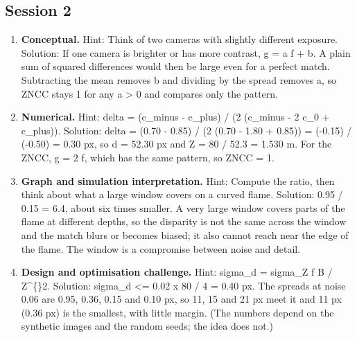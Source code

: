 \documentclass[11pt,a4paper]{article}
\begin{document}
\subsection*{Session 2}
\begin{enumerate}[nosep]
\item \textbf{Conceptual.} Hint: Think of two cameras with slightly different exposure. Solution: If one camera is brighter or has more contrast, g = a f + b. A plain sum of squared differences would then be large even for a perfect match. Subtracting the mean removes b and dividing by the spread removes a, so ZNCC stays 1 for any a > 0 and compares only the pattern.
\item \textbf{Numerical.} Hint: delta = (c\_minus - c\_plus) / (2 (c\_minus - 2 c\_0 + c\_plus)). Solution: delta = (0.70 - 0.85) / (2 (0.70 - 1.80 + 0.85)) = (-0.15) / (-0.50) = 0.30 px, so d = 52.30 px and Z = 80 / 52.3 = 1.530 m. For the ZNCC, g = 2 f, which has the same pattern, so ZNCC = 1.
\item \textbf{Graph and simulation interpretation.} Hint: Compute the ratio, then think about what a large window covers on a curved flame. Solution: 0.95 / 0.15 = 6.4, about six times smaller. A very large window covers parts of the flame at different depths, so the disparity is not the same across the window and the match blurs or becomes biased; it also cannot reach near the edge of the flame. The window is a compromise between noise and detail.
\item \textbf{Design and optimisation challenge.} Hint: sigma\_d = sigma\_Z f B / Z\textasciicircum\{\}2. Solution: sigma\_d <= 0.02 x 80 / 4 = 0.40 px. The spreads at noise 0.06 are 0.95, 0.36, 0.15 and 0.10 px, so 11, 15 and 21 px meet it and 11 px (0.36 px) is the smallest, with little margin. (The numbers depend on the synthetic images and the random seeds; the idea does not.)
\end{enumerate}
\end{document}
